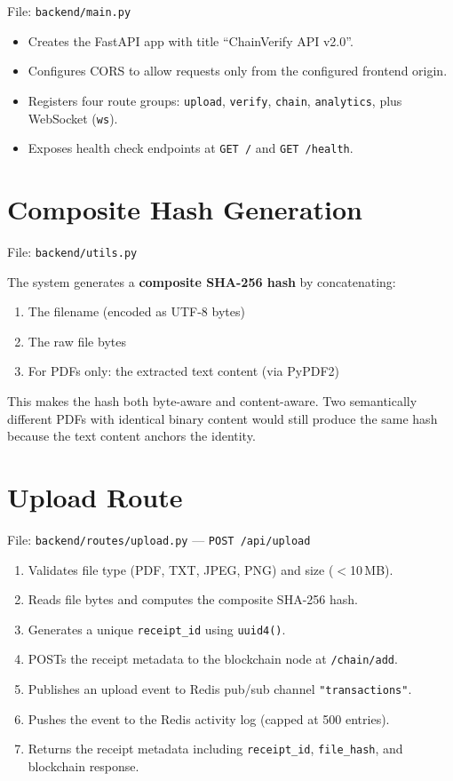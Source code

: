 \documentclass[12pt, a4paper]{report}
\begin{document}
File: \texttt{backend/main.py}

\begin{itemize}
    \item Creates the FastAPI app with title ``ChainVerify API v2.0''.
    \item Configures CORS to allow requests only from the configured frontend origin.
    \item Registers four route groups: \texttt{upload}, \texttt{verify},
          \texttt{chain}, \texttt{analytics}, plus WebSocket (\texttt{ws}).
    \item Exposes health check endpoints at \texttt{GET /} and
          \texttt{GET /health}.
\end{itemize}

\section{Composite Hash Generation}

File: \texttt{backend/utils.py}

The system generates a \textbf{composite SHA-256 hash} by concatenating:
\begin{enumerate}
    \item The filename (encoded as UTF-8 bytes)
    \item The raw file bytes
    \item For PDFs only: the extracted text content (via PyPDF2)
\end{enumerate}

This makes the hash both byte-aware and content-aware. Two semantically
different PDFs with identical binary content would still produce the same hash
because the text content anchors the identity.

\section{Upload Route}

File: \texttt{backend/routes/upload.py} — \texttt{POST /api/upload}

\begin{enumerate}
    \item Validates file type (PDF, TXT, JPEG, PNG) and size ($<$10\,MB).
    \item Reads file bytes and computes the composite SHA-256 hash.
    \item Generates a unique \texttt{receipt\_id} using \texttt{uuid4()}.
    \item POSTs the receipt metadata to the blockchain node at
          \texttt{/chain/add}.
    \item Publishes an upload event to Redis pub/sub channel
          \texttt{"transactions"}.
    \item Pushes the event to the Redis activity log (capped at 500 entries).
    \item Returns the receipt metadata including \texttt{receipt\_id},
          \texttt{file\_hash}, and blockchain response.
\end{enumerate}
\end{document}

